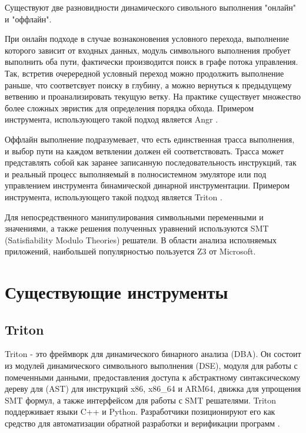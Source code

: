 Существуют две разновидности динамического сивольного выполнения "онлайн" и "оффлайн".

При онлайн подходе в случае вознаконовения условного перехода, выполнение которого зависит от входных данных, модуль символьного выполнения пробует выполнить оба пути, фактически производится поиск в графе потока управления. Так, встретив очерередной условный переход можно продолжить выполнение раньше, что соответсвует поиску в глубину, а можно вернуться к предыдущему ветвению и проанализировать текущую ветку. На практике существует множество более сложных эвристик для определения порядка обхода.
Примером инструмента, использующего такой подход является Angr \cite{Angr}.

Оффлайн выполнение подразумевает, что есть единственная трасса выполнения, и выбор пути на каждом ветвлении должен ей соответствовать. Трасса может представлять собой как заранее записанную последовательность инструкций, так и реальный процесс выполняемый в полносистемном эмуляторе или под управлением инструмента бинамической динарной инструментации.
Примером инструмента, использующего такой подход является Triton \cite{Triton}.

Для непосредственного манипулирования символьными переменными и значениями, а также решения полученных уравнений используются SMT (Satisfiability Modulo Theories) решатели. В области анализа исполняемых приложений, наибольшей популярностью пользуется Z3 \cite{Z3} от Microsoft.



\section{Существующие инструменты}


\subsection{Triton}

Triton - это фреймворк для динамического бинарного анализа (DBA). Он состоит из модулей динамического символьного выполнения (DSE), модуля для работы с помеченными данными, предоставления доступа к абстрактному синтаксическому дереву для (AST) для инструкций x86, x86\_64 и ARM64, движка для упрощения SMT формул, а также интерфейсом для работы с SMT решателями. Triton поддерживает языки C++ и Python.
Разработчики позиционируют его как средство для автоматизации обратной разработки и верификации программ \cite{Triton}.

